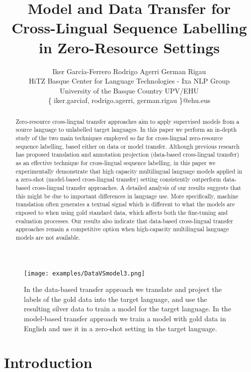 \documentclass[11pt]{article}
\title{Model and Data Transfer for Cross-Lingual Sequence Labelling in Zero-Resource Settings}
\author{Iker García-Ferrero \quad Rodrigo Agerri \quad German Rigau \\
         HiTZ Basque Center for Language Technologies - Ixa NLP Group \\
         University of the Basque Country UPV/EHU\\
         \{
         iker.garciaf,
         rodrigo.agerri,
         german.rigau
\}@ehu.eus}
\begin{document}
\maketitle
\begin{abstract}
Zero-resource cross-lingual transfer approaches aim to apply supervised models
from a source language to unlabelled target languages. In this paper we perform
an in-depth study of the two main techniques employed so far for cross-lingual
zero-resource sequence labelling, based either on data or model transfer.
Although previous research has proposed translation and annotation projection
(data-based cross-lingual transfer) as an effective technique for cross-lingual
sequence labelling, in this paper we experimentally demonstrate that high
capacity multilingual language models applied in a zero-shot (model-based
cross-lingual transfer) setting consistently outperform data-based
cross-lingual transfer approaches. A detailed analysis of our results suggests
that this might be due to important differences in language use. More
specifically, machine translation often generates a textual signal which is
different to what the models are exposed to when using gold standard data,
which affects both the fine-tuning and evaluation processes. Our results also
indicate that data-based cross-lingual transfer approaches remain a competitive
option when high-capacity multilingual language models are not available.
\end{abstract}

\begin{figure}[t]
    \centering
    \texttt{[image: examples/DataVSmodel3.png]}
    \caption{In the data-based transfer approach we translate and project the labels of the gold data into the target language, and use the resulting silver data to train a model for the target language. In the model-based transfer approach we train a model with gold data in English and use it in a zero-shot setting in the target language.}
    \label{fig:example}
\end{figure}

\section{Introduction}
\end{document}
